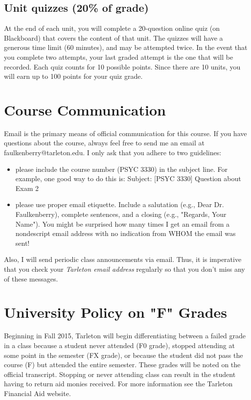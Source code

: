 \documentclass[10pt]{article}
\begin{document}
\subsection*{Unit quizzes (20\% of grade)}
\label{sec-5-2}
At the end of each unit, you will complete a 20-question online quiz (on Blackboard) that covers the content of that unit.  The quizzes will have a generous time limit (60 minutes), and may be attempted twice.  In the event that you complete two attempts, your last graded attempt is the one that will be recorded.  Each quiz counts for 10 possible points.  Since there are 10 units, you will earn up to 100 points for your quiz grade.

\section*{Course Communication}
\label{sec-6}

Email is the primary means of official communication for this course.  If you have questions about the course, always feel free to send me an email at faulkenberry@tarleton.edu.  I only ask that you adhere to two guidelines:
\begin{itemize}
\item please include the course number (PSYC 3330) in the subject line.  For example, one good way to do this is:  Subject: [PSYC 3330] Question about Exam 2
\item please use proper email etiquette.  Include a salutation (e.g., Dear Dr. Faulkenberry), complete sentences, and a closing (e.g., "Regards, Your Name").  You might be surprised how many times I get an email from a nondescript email address with no indication from WHOM the email was sent!
\end{itemize}

Also, I will send periodic class announcements via email.  Thus, it is imperative that you check your \emph{Tarleton email address} regularly so that you don't miss any of these messages.

\section*{University Policy on "F" Grades}
\label{sec-7}
Beginning in Fall 2015, Tarleton will begin differentiating between a failed grade in a class because a student never attended (F0 grade), stopped attending at some point in the semester (FX grade), or because the student did not pass the course (F) but attended the entire semester. These grades will be noted on the official transcript. Stopping or never attending class can result in the student having to return aid monies received.  For more information see the Tarleton Financial Aid website.
\end{document}
